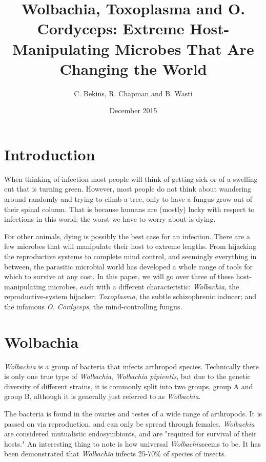 \documentclass[twocolumn]{article}
\begin{document}
\title{Wolbachia, Toxoplasma and O. Cordyceps: Extreme Host-Manipulating Microbes That Are Changing the World}
    \author{C. Bekins, R. Chapman and B. Wasti}
    \date{December 2015}
    \maketitle

\section*{Introduction}
When thinking of infection most people will think of getting sick or of a swelling cut that is turning green. However, most people do not think about wandering around randomly and trying to climb a tree, only to have a fungus grow out of their spinal column. That is because humans are (mostly) lucky with respect to infections in this world; the worst we have to worry about is dying.

For other animals, dying is possibly the best case for an infection. There are a few microbes that will manipulate their host to extreme lengths. From hijacking the reproductive systems to complete mind control, and seemingly everything in between, the parasitic microbial world has developed a whole range of tools for which to survive at any cost. In this paper, we will go over three of these host-manipulating microbes, each with a different characteristic: \textit{Wolbachia}, the reproductive-system hijacker; \textit{Toxoplasma}, the subtle schizophrenic inducer; and the infamous \textit{O. Cordyceps}, the mind-controlling fungus. 

\section*{Wolbachia}
\textit{Wolbachia} is a group of bacteria that infects arthropod species. Technically there is only one true type of \textit{Wolbachia}, \textit{Wolbachia pipientis}, but due to the genetic diversity of different strains, it is commonly split into two groups, group A and group B, although it is generally just referred to as \textit{Wolbachia}.

The bacteria is found in the ovaries and testes of a wide range of arthropods.\cite{Wbio} It is passed on via reproduction, and can only be spread through females. \textit{Wolbachia} are considered mutualistic endosymbionts, and are "required for survival of their hosts."\cite{Wdisc_nem} An interesting thing to note is how universal \textit{Wolbachia}seems to be. It has been demonstrated that \textit{Wolbachia} infects 25-70\% of species of insects.\cite{Wdisc_nem}
\end{document}
